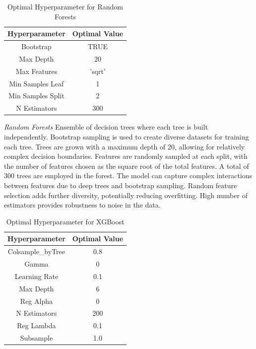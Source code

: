 \documentclass[conference]{IEEEtran}
\begin{document}
\begin{table}[H]
\centering
\caption{Optimal Hyperparameter for Random Forests}
\begin{tabular}{|c|c|}
\hline
Hyperparameter & Optimal Value \\
\hline
Bootstrap & TRUE \\
\hline
Max Depth & 20 \\
\hline
Max Features & 'sqrt' \\
\hline
Min Samples Leaf & 1 \\
\hline
Min Samples Split & 2 \\
\hline
N Estimators & 300 \\
\hline
\end{tabular}
\label{tab:mytable}
\end{table}

\emph{Random Forests} Ensemble of decision trees where each tree is built independently. Bootstrap sampling is used to create diverse datasets for training each tree. Trees are grown with a maximum depth of 20, allowing for relatively complex decision boundaries. Features are randomly sampled at each split, with the number of features chosen as the square root of the total features. A total of 300 trees are employed in the forest. The model can capture complex interactions between features due to deep trees and bootstrap sampling. Random feature selection adds further diversity, potentially reducing overfitting. High number of estimators provides robustness to noise in the data.

\begin{table}[H]
\centering
\caption{Optimal Hyperparameter for XGBoost}
\begin{tabular}{|c|c|}
\hline
Hyperparameter & Optimal Value \\
\hline
Colsample\_byTree & 0.8 \\
\hline
Gamma & 0 \\
\hline
Learning Rate & 0.1 \\
\hline
Max Depth & 6 \\
\hline
Reg Alpha & 0 \\
\hline
N Estimators & 200 \\
\hline
Reg Lambda & 0.1 \\
\hline
Subsample & 1.0 \\
\hline
\end{tabular}
\label{tab:mytable}
\end{table}
\end{document}
